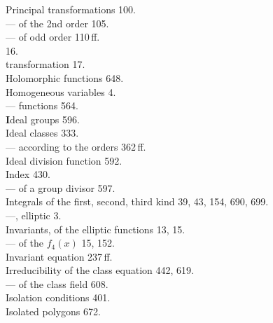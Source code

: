 \begin{minipage}[t]{0.48\textwidth}
Principal transformations 100. \\
--- of the 2nd order 105. \\
--- of odd order 110\,ff. \\
 16. \\
 transformation 17. \\
Holomorphic functions 648. \\
Homogeneous variables 4. \\
---  functions 564. \\[4pt]
\textbf{I}deal groups 596. \\
Ideal classes 333. \\
--- according to the orders 362\,ff. \\
Ideal division function 592. \\
Index 430. \\
--- of a group divisor 597. \\
Integrals of the first, second, third kind 39, 43, 154, 690, 699. \\
---, elliptic 3. \\
Invariants, of the elliptic functions 13, 15. \\
--- of the $f_4(x)$ 15, 152. \\
Invariant equation 237\,ff. \\
Irreducibility of the class equation 442, 619. \\
--- of the class field 608. \\
Isolation conditions 401. \\
Isolated polygons 672.
\end{minipage}
